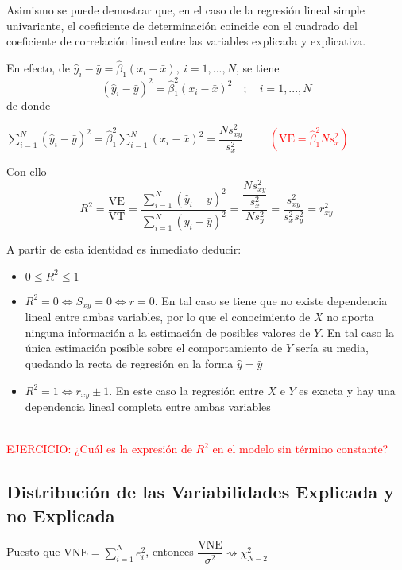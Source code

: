 \documentclass[10pt,a4paper]{book}
\begin{document}
Asimismo se puede demostrar que, en el caso de la regresión lineal simple univariante, el coeficiente de determinación coincide con el cuadrado del coeficiente de correlación lineal entre las variables explicada y explicativa.

En efecto, de $\widehat{y}_i-\bar{y}=\widehat{\beta}_1(x_i-\bar{x}),\ i=1,...,N$, se tiene $$(\widehat{y}_i-\bar{y})^2=\widehat{\beta}_1^2(x_i-\bar{x})^2\quad ;\quad i=1,...,N$$ de donde 
\begin{center}
$\displaystyle\sum^N_{i=1}(\widehat{y}_i-\bar{y})^2=\widehat{\beta}_1^2\displaystyle\sum^N_{i=1}(x_i-\bar{x})^2=\dfrac{Ns^2_{xy}}{s^2_x}\qquad$ \textcolor{red}{$\left(\mathrm{VE}=\widehat{\beta}^2_1Ns^2_x\right)$}
\end{center}

Con ello $$R^2=\dfrac{\mathrm{VE}}{\mathrm{VT}}=\dfrac{\displaystyle\sum^N_{i=1}(\widehat{y}_i-\bar{y})^2}{\displaystyle\sum^N_{i=1}(y_i-\bar{y})^2}=\dfrac{\dfrac{Ns^2_{xy}}{s^2_x}}{Ns^2_y}=\dfrac{s^2_{xy}}{s^2_xs^2_y}=r^2_{xy}$$

A partir de esta identidad es inmediato deducir:
\begin{itemize}
\item $0 \leq R^2 \leq 1$
\item $R^2=0\Leftrightarrow S_{xy}=0\Leftrightarrow r=0$. En tal caso se tiene que no existe dependencia lineal entre ambas variables, por lo que el conocimiento de $X$ no aporta ninguna información a la estimación de posibles valores de $Y$. En tal caso la única estimación posible sobre el comportamiento de $Y$ sería su media, quedando la recta de regresión en la forma $\widehat{y}=\bar{y}$
\item $R^2=1\Leftrightarrow r_{xy}\pm 1$. En este caso la regresión entre $X$ e $Y$ es exacta y hay una dependencia lineal completa entre ambas variables
\end{itemize}
\ \\

\textcolor{red}{EJERCICIO: ¿Cuál es la expresión de $R^2$ en el modelo sin término constante?}
\ \\

		\subsection{Distribución de las Variabilidades Explicada y no Explicada}
Puesto que $\mathrm{VNE}=\displaystyle\sum^N_{i=1}e^2_i$, entonces $\dfrac{\mathrm{VNE}}{\sigma^2}\rightsquigarrow \chi^2_{N-2}$
\end{document}
